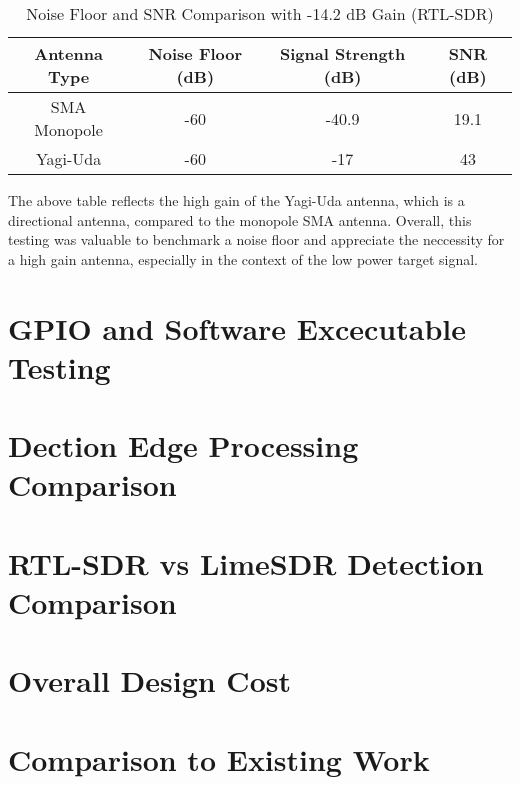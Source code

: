 \begin{table}[h!]
    \centering
    \caption{Noise Floor and SNR Comparison with -14.2 dB Gain (RTL-SDR)}
    \label{tab:signalstrength}
    \begin{tabular}{|c|c|c|c|}
        \hline
        \textbf{Antenna Type} & \textbf{Noise Floor (dB)} & \textbf{Signal Strength (dB)} & \textbf{SNR (dB)} \\ \hline
        SMA Monopole & -60 & -40.9 & 19.1 \\ \hline
        Yagi-Uda     & -60 & -17   & 43   \\ \hline
    \end{tabular}
    \vspace{0.5cm}
\end{table}

The above table reflects the high gain of the Yagi-Uda antenna, which is a directional antenna, compared to the monopole SMA antenna. Overall, this testing was valuable to benchmark a noise floor and appreciate the neccessity for a high gain antenna, especially in the context of the low power target signal.

\section{GPIO and Software Excecutable Testing \label{sec:gpioTesting}}

\section{Dection Edge Processing Comparison} \label{sec:edgeProcessing}


\section{RTL-SDR vs LimeSDR Detection Comparison \label{sec:SDRcomparison}}

\section{Overall Design Cost}

\section{Comparison to Existing Work}
